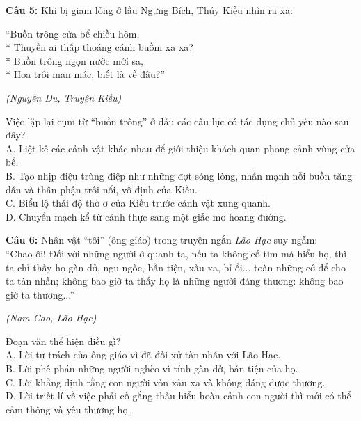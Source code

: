 \documentclass[12pt,a4paper]{article}
\begin{document}


\vspace{0.3cm}

\noindent \textbf{Câu 5:} Khi bị giam lỏng ở lầu Ngưng Bích, Thúy Kiều nhìn ra xa:
\begin{center}
``Buồn trông cửa bể chiều hôm,\\*
Thuyền ai thấp thoáng cánh buồm xa xa?\\*
Buồn trông ngọn nước mới sa,\\*
Hoa trôi man mác, biết là về đâu?''
\end{center}
\begin{flushright}\small\textit{(Nguyễn Du, Truyện Kiều)}\end{flushright}
Việc lặp lại cụm từ ``buồn trông'' ở đầu các câu lục có tác dụng chủ yếu nào sau đây?\\
\noindent A. Liệt kê các cảnh vật khác nhau để giới thiệu khách quan phong cảnh vùng cửa bể.\\
\noindent B. Tạo nhịp điệu trùng điệp như những đợt sóng lòng, nhấn mạnh nỗi buồn tăng dần và thân phận trôi nổi, vô định của Kiều.\\
\noindent C. Biểu lộ thái độ thờ ơ của Kiều trước cảnh vật xung quanh.\\
\noindent D. Chuyển mạch kể từ cảnh thực sang một giấc mơ hoang đường.



\vspace{0.3cm}

\noindent \textbf{Câu 6:} Nhân vật ``tôi'' (ông giáo) trong truyện ngắn \textit{Lão Hạc} suy ngẫm:\\
``Chao ôi! Đối với những người ở quanh ta, nếu ta không cố tìm mà hiểu họ, thì ta chỉ thấy họ gàn dở, ngu ngốc, bần tiện, xấu xa, bỉ ổi... toàn những cớ để cho ta tàn nhẫn; không bao giờ ta thấy họ là những người đáng thương: không bao giờ ta thương...''
\begin{flushright}\small\textit{(Nam Cao, Lão Hạc)}\end{flushright}
Đoạn văn thể hiện điều gì?\\
\noindent A. Lời tự trách của ông giáo vì đã đối xử tàn nhẫn với Lão Hạc.\\
\noindent B. Lời phê phán những người nghèo vì tính gàn dở, bần tiện của họ.\\
\noindent C. Lời khẳng định rằng con người vốn xấu xa và không đáng được thương.\\
\noindent D. Lời triết lí về việc phải cố gắng thấu hiểu hoàn cảnh con người thì mới có thể cảm thông và yêu thương họ.
\end{document}
